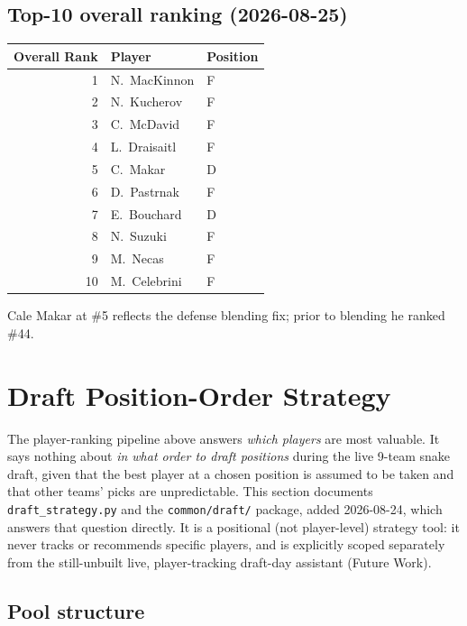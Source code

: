 \documentclass[11pt, a4paper]{article}
\begin{document}
\subsection{Top-10 overall ranking (2026-08-25)}

\begin{center}
\begin{tabular}{rll}
\toprule
Overall Rank & Player & Position \\
\midrule
1  & N.\ MacKinnon  & F \\
2  & N.\ Kucherov   & F \\
3  & C.\ McDavid    & F \\
4  & L.\ Draisaitl  & F \\
5  & C.\ Makar      & D \\
6  & D.\ Pastrnak   & F \\
7  & E.\ Bouchard   & D \\
8  & N.\ Suzuki     & F \\
9  & M.\ Necas      & F \\
10 & M.\ Celebrini  & F \\
\bottomrule
\end{tabular}
\end{center}

Cale Makar at \#5 reflects the defense blending fix; prior to blending he ranked \#44.


\section{Draft Position-Order Strategy}
\label{sec:draftstrategy}

The player-ranking pipeline above answers \emph{which players} are most valuable. It says
nothing about \emph{in what order to draft positions} during the live 9-team snake draft, given
that the best player at a chosen position is assumed to be taken and that other teams' picks are
unpredictable. This section documents \texttt{draft\_strategy.py} and the \texttt{common/draft/}
package, added 2026-08-24, which answers that question directly. It is a positional (not
player-level) strategy tool: it never tracks or recommends specific players, and is explicitly
scoped separately from the still-unbuilt live, player-tracking draft-day assistant (Future Work).

\subsection{Pool structure}
\end{document}
